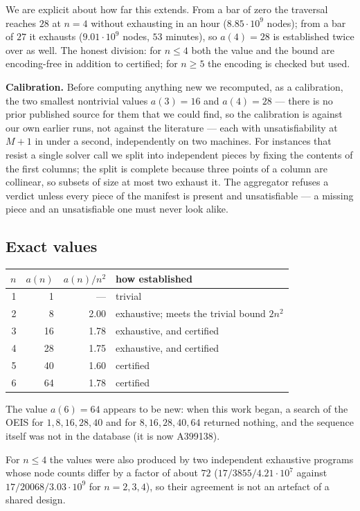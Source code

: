 \documentclass[11pt,a4paper]{article}
\begin{document}
We are explicit about how far this extends.  From a bar of zero the traversal reaches $28$ at $n=4$ without
exhausting in an hour ($8.85\cdot10^9$ nodes); from a bar of $27$ it exhausts ($9.01\cdot10^9$ nodes, $53$
minutes), so $a(4)=28$ is established twice over as well.  The honest division: for $n\le4$ both the value and
the bound are encoding-free in addition to certified; for $n\ge5$ the encoding is checked but used.

\medskip\noindent\textbf{Calibration.}  Before computing anything new we recomputed, as a calibration, the two
smallest nontrivial values $a(3)=16$ and $a(4)=28$ --- there is no prior published source for them that we could
find, so the calibration is against our own earlier runs, not against the literature --- each with unsatisfiability
at $M+1$ in under a second, independently on two machines.
For instances that resist a single solver call we split into independent pieces by fixing the contents of the
first columns; the split is complete because three points of a column are collinear, so subsets of size at most
two exhaust it.  The aggregator refuses a verdict unless every piece of the manifest is present and
unsatisfiable --- a missing piece and an unsatisfiable one must never look alike.

\subsection{Exact values}\label{s:exact3}
\begin{center}\begin{tabular}{rrrl}\toprule
$n$ & $a(n)$ & $a(n)/n^2$ & how established\\\midrule
1 & 1 & --- & trivial\\
2 & 8 & 2.00 & exhaustive; meets the trivial bound $2n^2$\\
3 & 16 & 1.78 & exhaustive, and certified\\
4 & 28 & 1.75 & exhaustive, and certified\\
5 & 40 & 1.60 & certified\\
6 & 64 & 1.78 & certified\\\bottomrule
\end{tabular}\end{center}
\noindent The value $a(6)=64$ appears to be new: when this work began, a search of the OEIS for $1,8,16,28,40$ and for
$8,16,28,40,64$ returned nothing, and the sequence itself was not in the database (it is now A399138).

For $n\le4$ the values were also produced by two independent exhaustive programs whose node counts differ by
a factor of about $72$ ($17/3855/4.21\cdot10^7$ against $17/20068/3.03\cdot10^9$ for $n=2,3,4$), so their
agreement is not an artefact of a shared design.
\end{document}
